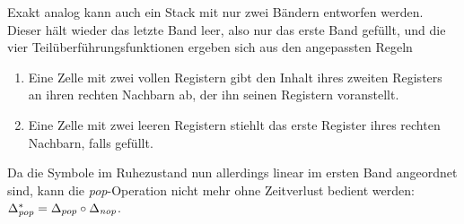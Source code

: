 \documentclass{article}
\begin{document}
Exakt analog kann auch ein Stack mit nur zwei Bändern entworfen werden. Dieser hält wieder das letzte Band leer, also nur das erste Band gefüllt, und die vier Teilüberführungsfunktionen ergeben sich aus den angepassten Regeln
\begin{enumerate}
    \item Eine Zelle mit zwei vollen Registern gibt den Inhalt ihres zweiten Registers an ihren rechten Nachbarn ab, der ihn seinen Registern voranstellt.
        \begin{center}
        \end{center}
    \item Eine Zelle mit zwei leeren Registern stiehlt das erste Register ihres rechten Nachbarn, falls gefüllt.
        \begin{center}
        \end{center}
\end{enumerate}
Da die Symbole im Ruhezustand nun allerdings linear im ersten Band angeordnet sind, kann die \emph{pop}-Operation nicht mehr ohne Zeitverlust bedient werden: $\Delta^*_{\mathit{pop}}=\Delta_{pop} \circ \Delta_{\mathit{nop}}$.
\end{document}
